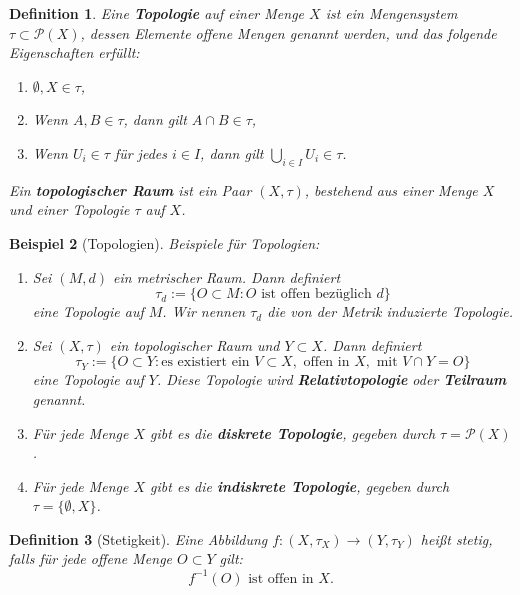 \documentclass[a4paper,12pt]{article}
\theoremstyle{break}
\newtheorem{definition}{Definition}[section]
\newtheorem{example}[definition]{Beispiel}
\begin{document}
\begin{definition}
Eine \textbf{Topologie} auf einer Menge $X$ ist ein Mengensystem $\tau \subset \mathcal{P}(X)$, dessen Elemente \textit{offene Mengen} genannt werden, und das folgende Eigenschaften erfüllt:
\begin{enumerate}
    \item $\emptyset, X \in \tau$,
    \item Wenn $A, B \in \tau$, dann gilt $A \cap B \in \tau$,
    \item Wenn $U_i \in \tau$ für jedes $i \in I$, dann gilt $\bigcup_{i \in I} U_i \in \tau$.
\end{enumerate}
Ein \textbf{topologischer Raum} ist ein Paar $(X, \tau)$, bestehend aus einer Menge $X$ und einer Topologie $\tau$ auf $X$.
\end{definition}

\begin{example}[Topologien]
Beispiele für Topologien:
\begin{enumerate}
    \item Sei $(M, d)$ ein metrischer Raum. Dann definiert 
    \[
    \tau_d := \{O \subset M : O \text{ ist offen bezüglich } d\}
    \]
    eine Topologie auf $M$. Wir nennen $\tau_d$ die von der Metrik induzierte Topologie.
    
    \item Sei $(X, \tau)$ ein topologischer Raum und $Y \subset X$. Dann definiert 
    \[
    \tau_Y := \{O \subset Y : \text{es existiert ein } V \subset X, \text{ offen in } X, \text{ mit } V \cap Y = O\}
    \]
    eine Topologie auf $Y$. Diese Topologie wird \textbf{Relativtopologie} oder \textbf{Teilraum} genannt.
    
    \item Für jede Menge $X$ gibt es die \textbf{diskrete Topologie}, gegeben durch $\tau = \mathcal{P}(X)$.
    
    \item Für jede Menge $X$ gibt es die \textbf{indiskrete Topologie}, gegeben durch $\tau = \{\emptyset, X\}$.
\end{enumerate}
\end{example}

\begin{definition}[Stetigkeit]
Eine Abbildung $f : (X, \tau_X) \to (Y, \tau_Y)$ heißt \textit{stetig}, falls für jede offene Menge $O \subset Y$ gilt:
\[
f^{-1}(O) \text{ ist offen in } X.
\]
\end{definition}
\end{document}
